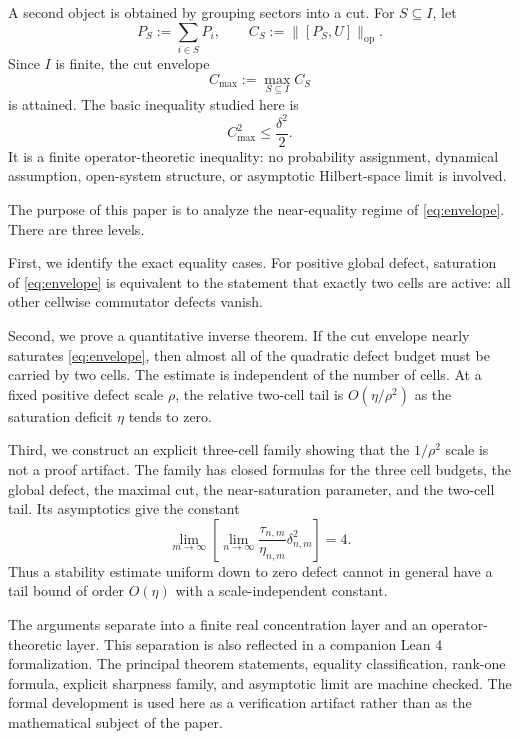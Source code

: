 \documentclass[11pt]{article}
\newcommand{\op}{\mathrm{op}}
\newcommand{\cmax}{C_{\max}}
\newcommand{\dd}{\delta}
\newcommand{\etaq}{\eta}
\newcommand{\tauq}{\tau}
\begin{document}
A second object is obtained by grouping sectors into a cut.  For
$S\subseteq I$, let
\[
  P_S:=\sum_{i\in S}P_i,\qquad
  C_S:=\|[P_S,U]\|_{\op}.
\]
Since $I$ is finite, the cut envelope
\[
  \cmax:=\max_{S\subseteq I}C_S
\]
is attained.  The basic inequality studied here is
\begin{equation}\label{eq:envelope}
  \cmax^2\le \frac{\dd^2}{2}.
\end{equation}
It is a finite operator-theoretic inequality: no probability assignment,
dynamical assumption, open-system structure, or asymptotic Hilbert-space
limit is involved.

The purpose of this paper is to analyze the near-equality regime of
\eqref{eq:envelope}.  There are three levels.

First, we identify the exact equality cases.  For positive global defect,
saturation of \eqref{eq:envelope} is equivalent to the statement that exactly
two cells are active: all other cellwise commutator defects vanish.

Second, we prove a quantitative inverse theorem.  If the cut envelope nearly
saturates \eqref{eq:envelope}, then almost all of the quadratic defect budget
must be carried by two cells.  The estimate is independent of the number of
cells.  At a fixed positive defect scale $\rho$, the relative two-cell tail is
$O(\etaq/\rho^2)$ as the saturation deficit $\etaq$ tends to zero.

Third, we construct an explicit three-cell family showing that the
$1/\rho^2$ scale is not a proof artifact.  The family has closed formulas for
the three cell budgets, the global defect, the maximal cut, the
near-saturation parameter, and the two-cell tail.  Its asymptotics give the
constant
\[
  \lim_{m\to\infty}\left[
    \lim_{n\to\infty}\frac{\tauq_{n,m}}{\etaq_{n,m}}\dd_{n,m}^2
  \right]=4.
\]
Thus a stability estimate uniform down to zero defect cannot in general have
a tail bound of order $O(\etaq)$ with a scale-independent constant.

The arguments separate into a finite real concentration layer and an
operator-theoretic layer.  This separation is also reflected in a companion
Lean 4 formalization.  The principal theorem statements, equality
classification, rank-one formula, explicit sharpness family, and asymptotic
limit are machine checked.  The formal development is used here as a
verification artifact rather than as the mathematical subject of the paper.

\end{document}
